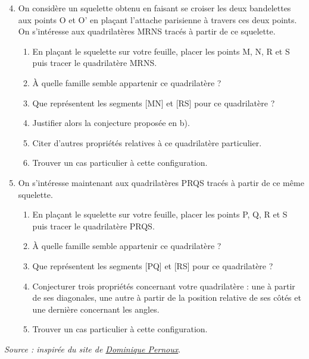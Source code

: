 \begin{activite}
\begin{changemargin}{-10mm}{-15mm}
        \vspace*{-10mm}
            \begin{enumerate}
            \setcounter{enumi}{3}
                \item On considère un squelette obtenu en faisant se croiser les deux bandelettes aux points O et O' en plaçant l'attache parisienne à travers ces deux points. On s'intéresse aux quadrilatères MRNS tracés à partir de ce squelette.
                \begin{enumerate}
                \item En plaçant le squelette sur votre feuille, placer les points M, N, R et S puis tracer le quadrilatère MRNS.
                \item À quelle famille semble appartenir ce quadrilatère ?
                \item Que représentent les segments [MN] et [RS] pour ce quadrilatère ?
                \item Justifier alors la conjecture proposée en b).
                \item Citer d'autres propriétés relatives à ce quadrilatère particulier.
                \item Trouver un cas particulier à cette configuration.
                \end{enumerate}
                \item On s'intéresse maintenant aux quadrilatères PRQS tracés à partir de ce même squelette.
                \begin{enumerate}
                \item En plaçant le squelette sur votre feuille, placer les points P, Q, R et S puis tracer le quadrilatère PRQS.
                \item À quelle famille semble appartenir ce quadrilatère ?
                \item Que représentent les segments [PQ] et [RS] pour ce quadrilatère ?
                \item Conjecturer trois propriétés concernant votre quadrilatère : une à partir de ses diagonales, une autre à partir de la position relative de ses côtés et une dernière concernant les angles.
                    \item Trouver un cas particulier à cette configuration.
                \end{enumerate}
        \end{enumerate}    
        \hfill{\it\footnotesize Source : inspirée du site de \href{http://pernoux.pagesperso-orange.fr/revision/revgeo.pdf}{Dominique Pernoux}}.
        \vspace*{-15mm}
    \end{changemargin}
\end{activite}